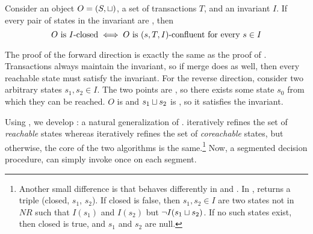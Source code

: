 \begin{theorem}
  Consider an object $O = (S, \sqcup)$, a set of transactions $T$, and an
  invariant $I$. If every pair of states in the invariant are \TIcoreachable{},
  then
  \[
    \text{$O$ is $I$-closed{}}
    \iff
    \text{$O$ is $(s, T, I)$-confluent for every $s \in I$}
  \]
\end{theorem}

The proof of the forward direction is exactly the same as the proof of
. Transactions always maintain the
invariant, so if merge does as well, then every reachable state must satisfy
the invariant.
%
For the reverse direction, consider two arbitrary states $s_1, s_2 \in I$.
The two points are \TIcoreachable{}, so there exists some state $s_0$ from
which they can be reached. $O$ is \sTIconfluent{} and $s_1 \sqcup s_2$ is
\sTIreachable{}, so it satisfies the invariant.

Using , we develop
: a natural generalization
of .
 iteratively refines the set of
\emph{reachable} states whereas
 iteratively refines the
set of \emph{coreachable} states, but otherwise, the core of the two algorithms
is the same.\footnote{%
  Another small difference is that \IsIclosed{} behaves differently in
   and
  . In
  , \IsIclosed{} returns a
  triple (closed, $s_1$, $s_2$). If closed is false, then $s_1, s_2 \in I$
  are two states not in $NR$ such that $I(s_1)$ and $I(s_2)$ but $\lnot I(s_1
  \sqcup s_2)$. If no such states exist, then closed is true, and $s_1$ and
  $s_2$ are null.
}
Now, a segmented \invariantconfluence{} decision procedure, can simply invoke
 once on each segment.

